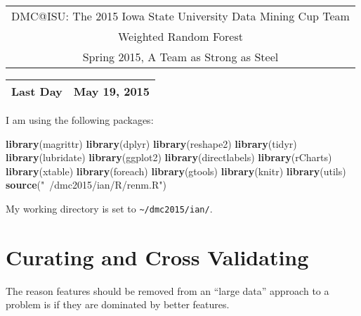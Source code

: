 \documentclass[10pt]{report}
\newenvironment{Shaded}{}{}
\newcommand{\KeywordTok}[1]{\textcolor[rgb]{0.00,0.44,0.13}{\textbf{{#1}}}}
\newcommand{\StringTok}[1]{\textcolor[rgb]{0.25,0.44,0.63}{{#1}}}
\newcommand{\NormalTok}[1]{{#1}}
\begin{document}
\thispagestyle{empty}%
\begin{center}%
    \renewcommand{\arraystretch}{1.5}%
    \begin{tabular}{c}%
       \Large{DMC@ISU: The 2015 Iowa State University Data Mining Cup Team}\\
       Weighted Random Forest\\
       Spring 2015, A Team as Strong as Steel \\
    \end{tabular}
\end{center}

\begin{center}
 \renewcommand{\arraystretch}{1.5}
 \begin{tabular*}{0.65\textwidth}{r@{:\hspace{.3cm}}l}
    \hline
    
    
    Last Day&  May 19, 2015\\
    \hline
 \end{tabular*}
\end{center}

I am using the following packages:

\begin{Shaded}
\begin{Highlighting}[]
   \KeywordTok{library}\NormalTok{(magrittr)}
   \KeywordTok{library}\NormalTok{(dplyr)}
   \KeywordTok{library}\NormalTok{(reshape2)}
   \KeywordTok{library}\NormalTok{(tidyr)}
   \KeywordTok{library}\NormalTok{(lubridate)}
   \KeywordTok{library}\NormalTok{(ggplot2)}
   \KeywordTok{library}\NormalTok{(directlabels)}
   \KeywordTok{library}\NormalTok{(rCharts)}
   \KeywordTok{library}\NormalTok{(xtable)}
   \KeywordTok{library}\NormalTok{(foreach)}
   \KeywordTok{library}\NormalTok{(gtools)}
   \KeywordTok{library}\NormalTok{(knitr)}
   \KeywordTok{library}\NormalTok{(utils)}
   \KeywordTok{source}\NormalTok{(}\StringTok{"~/dmc2015/ian/R/renm.R"}\NormalTok{)}
\end{Highlighting}
\end{Shaded}

My working directory is set to \verb!~/dmc2015/ian/!.

\section{Curating and Cross
Validating}\label{curating-and-cross-validating}

The reason features should be removed from an ``large data'' approach to
a problem is if they are dominated by better features.
\end{document}
